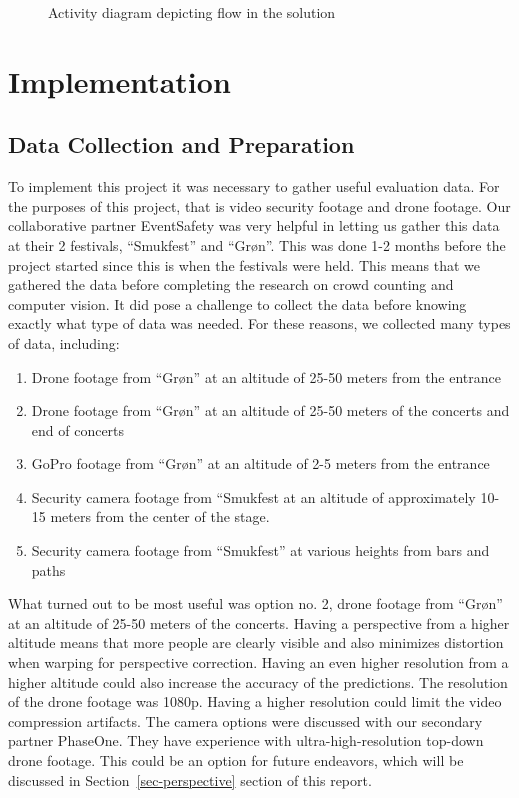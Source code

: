\documentclass[
]{article}
\begin{document}
\begin{figure}
{}

\caption{\label{fig-activity-diagram}Activity diagram depicting flow in
the solution}

\end{figure}

\newpage{}

\hypertarget{implementation}{%
\section{Implementation}\label{implementation}}

\hypertarget{data-collection-and-preparation}{%
\subsection{Data Collection and
Preparation}\label{data-collection-and-preparation}}

To implement this project it was necessary to gather useful evaluation
data. For the purposes of this project, that is video security footage
and drone footage. Our collaborative partner EventSafety was very
helpful in letting us gather this data at their 2 festivals,
``Smukfest'' and ``Grøn''. This was done 1-2 months before the project
started since this is when the festivals were held. This means that we
gathered the data before completing the research on crowd counting and
computer vision. It did pose a challenge to collect the data before
knowing exactly what type of data was needed. For these reasons, we
collected many types of data, including:

\begin{enumerate}
\def\labelenumi{\arabic{enumi}.}
\item
  Drone footage from ``Grøn'' at an altitude of 25-50 meters from the
  entrance
\item
  Drone footage from ``Grøn'' at an altitude of 25-50 meters of the
  concerts and end of concerts
\item
  GoPro footage from ``Grøn'' at an altitude of 2-5 meters from the
  entrance
\item
  Security camera footage from ``Smukfest at an altitude of
  approximately 10-15 meters from the center of the stage.
\item
  Security camera footage from ``Smukfest'' at various heights from bars
  and paths
\end{enumerate}

What turned out to be most useful was option no. 2, drone footage from
``Grøn'' at an altitude of 25-50 meters of the concerts. Having a
perspective from a higher altitude means that more people are clearly
visible and also minimizes distortion when warping for perspective
correction. Having an even higher resolution from a higher altitude
could also increase the accuracy of the predictions. The resolution of
the drone footage was 1080p. Having a higher resolution could limit the
video compression artifacts. The camera options were discussed with our
secondary partner PhaseOne. They have experience with
ultra-high-resolution top-down drone footage. This could be an option
for future endeavors, which will be discussed in
Section~\ref{sec-perspective} section of this report.
\end{document}
